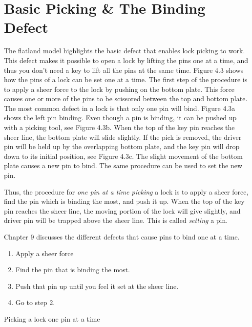 \chapter{Basic Picking \& The Binding Defect}
The flatland model highlights the basic defect that enables lock picking to work. This defect
makes it possible to open a lock by lifting the pins one at a time, and thus you don't need a
key to lift all the pins at the same time. Figure 4.3 shows how the pins of a lock can be set
one at a time. The first step of the procedure is to apply a sheer force to the lock by pushing
on the bottom plate. This force causes one or more of the pins to be scissored between the
top and bottom plate. The most common defect in a lock is that only one pin will bind.
Figure 4.3a shows the left pin binding. Even though a pin is binding, it can be pushed up
with a picking tool, see Figure 4.3b. When the top of the key pin reaches the sheer line,
the bottom plate will slide slightly. If the pick is removed, the driver pin will be held up
by the overlapping bottom plate, and the key pin will drop down to its initial position, see
Figure 4.3c. The slight movement of the bottom plate causes a new pin to bind. The same
procedure can be used to set the new pin.

Thus, the procedure for \textit{one pin at a time picking} a lock is to apply a sheer force, find
the pin which is binding the most, and push it up. When the top of the key pin reaches the
sheer line, the moving portion of the lock will give slightly, and driver pin will be trapped
above the sheer line. This is called \textit{setting} a pin.

Chapter 9 discusses the different defects that cause pins to bind one at a time.

\begin{table}
    \begin{enumerate}
        \item Apply a sheer force
        \item Find the pin that is binding the most.
        \item Push that pin up until you feel it set at the sheer line.
        \item Go to step 2.
    \end{enumerate}
    \caption{Picking a lock one pin at a time}
\end{table}
